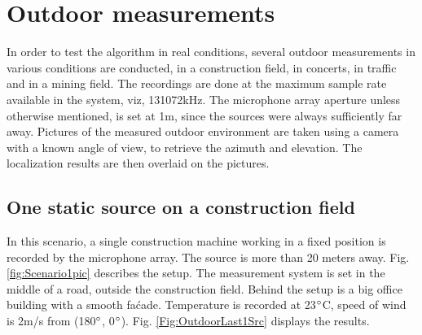 %

\newpage

\section{Outdoor measurements}
In order to test the algorithm in real conditions, several outdoor measurements in various conditions are conducted, in a construction field, in concerts, in traffic and in a mining field. The recordings are done at the maximum sample rate available in the system, viz, 131072kHz. The microphone array aperture unless otherwise mentioned, is set at 1m, since the sources were always sufficiently far away. Pictures of the measured outdoor environment are taken using a camera with a known angle of view, to retrieve the azimuth and elevation. The localization results are then overlaid on the pictures.

\subsection{One static source on a construction field}

In this scenario, a single construction machine working in a fixed position is recorded by the microphone array. The source is more than 20 meters away. Fig. \ref{fig:Scenario1pic} describes the setup. The measurement system is set in the middle of a road, outside the construction field. Behind the setup is a big office building with a smooth faćade. Temperature is recorded at 23$\degree$C, speed of wind is 2m/s from (180$\degree$, 0$\degree$). Fig. \ref{Fig:OutdoorLast1Src} displays the results.

